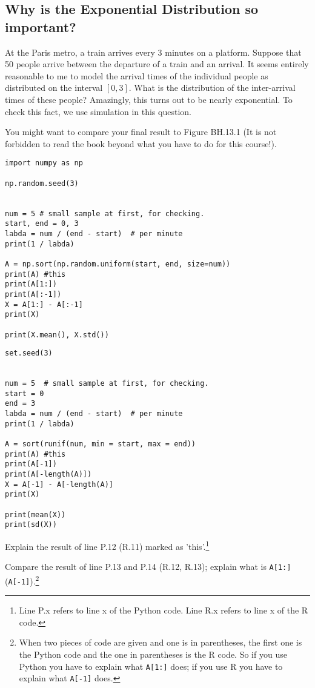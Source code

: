 

\subsection{Why is the Exponential Distribution so important?}

At the Paris metro, a train arrives every 3 minutes on a platform.
Suppose that 50 people arrive between the departure of a train and an arrival.
It seems entirely reasonable to me to model the arrival times of the individual people as distributed on the interval \([0,3]\).
What is the distribution of the inter-arrival times of these people? Amazingly, this turns out to be nearly exponential. To check this fact, we use simulation in this question.

You might want to compare your final result to Figure BH.13.1 (It is not forbidden to read the book beyond what you have to do for this course!).


\begin{verbatim}
import numpy as np

np.random.seed(3)


num = 5 # small sample at first, for checking.
start, end = 0, 3
labda = num / (end - start)  # per minute
print(1 / labda)

A = np.sort(np.random.uniform(start, end, size=num))
print(A) #this
print(A[1:])
print(A[:-1])
X = A[1:] - A[:-1]
print(X)

print(X.mean(), X.std())
\end{verbatim}


\begin{verbatim}
set.seed(3)


num = 5  # small sample at first, for checking.
start = 0
end = 3
labda = num / (end - start)  # per minute
print(1 / labda)

A = sort(runif(num, min = start, max = end))
print(A) #this
print(A[-1])
print(A[-length(A)])
X = A[-1] - A[-length(A)]
print(X)

print(mean(X))
print(sd(X))
\end{verbatim}

\begin{exercise}
Explain the result of line P.12 (R.11) marked as 'this'.\footnote{Line P.x refers to line x of the Python code.
  Line R.x refers to line x of the R code.}
\end{exercise}

\begin{exercise}
Compare the result of  line P.13 and P.14 (R.12, R.13);  explain what is \texttt{A[1:]} (\texttt{A[-1]}).\footnote{When two pieces of code are given and one is in parentheses, the first one is the Python code and the one in parentheses is the R code. So if you use Python you have to explain what  \texttt{A[1:]} does; if you use R you have to explain what \texttt{A[-1]} does.}
\end{exercise}

